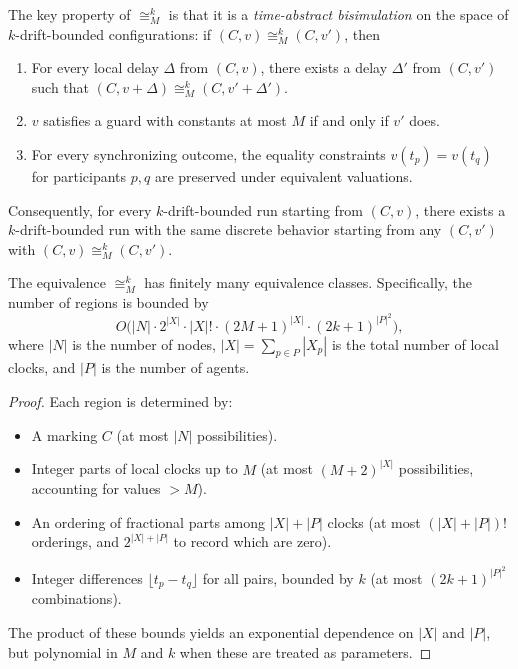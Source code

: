The key property of $\cong_M^k$ is that it is a \emph{time-abstract bisimulation} on the space of $k$-drift-bounded configurations: if $(C,v) \cong_M^k (C,v')$, then
\begin{enumerate}
\item For every local delay $\Delta$ from $(C,v)$, there exists a delay $\Delta'$ from $(C,v')$ such that $(C,v+\Delta) \cong_M^k (C,v'+\Delta')$.
\item $v$ satisfies a guard with constants at most $M$ if and only if $v'$ does.
\item For every synchronizing outcome, the equality constraints $v(t_p) = v(t_q)$ for participants $p, q$ are preserved under equivalent valuations.
\end{enumerate}

Consequently, for every $k$-drift-bounded run starting from $(C,v)$, there exists a $k$-drift-bounded run with the same discrete behavior starting from any $(C,v')$ with $(C,v) \cong_M^k (C,v')$.

\begin{lemma}
\label{lem:finite-regions}
The equivalence $\cong_M^k$ has finitely many equivalence classes. Specifically, the number of regions is bounded by
\[
O\bigl( |N| \cdot 2^{|X|} \cdot |X|! \cdot (2M+1)^{|X|} \cdot (2k+1)^{|P|^2} \bigr),
\]
where $|N|$ is the number of nodes, $|X| = \sum_{p \in P} |X_p|$ is the total number of local clocks, and $|P|$ is the number of agents.
\end{lemma}

\begin{proof}
Each region is determined by:
\begin{itemize}
\item A marking $C$ (at most $|N|$ possibilities).
\item Integer parts of local clocks up to $M$ (at most $(M+2)^{|X|}$ possibilities, accounting for values $> M$).
\item An ordering of fractional parts among $|X| + |P|$ clocks (at most $(|X| + |P|)!$ orderings, and $2^{|X|+|P|}$ to record which are zero).
\item Integer differences $\lfloor t_p - t_q \rfloor$ for all pairs, bounded by $k$ (at most $(2k+1)^{|P|^2}$ combinations).
\end{itemize}
The product of these bounds yields an exponential dependence on $|X|$ and $|P|$, but polynomial in $M$ and $k$ when these are treated as parameters.
\end{proof}

